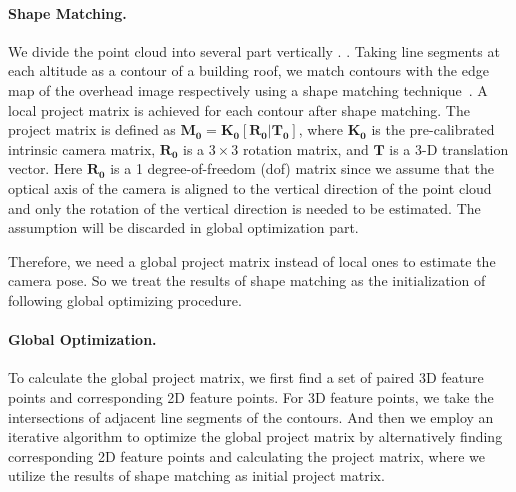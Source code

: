 \paragraph{Shape Matching.}
%
We divide the point cloud into several part vertically . 
 .
%
Taking line segments at each altitude as a contour of a building roof, we match contours with the edge map of the overhead image respectively using a shape matching technique~\cite{Zhang}. 
%
A local project matrix is achieved for each contour after shape matching. The project matrix is defined as $\mathbf{M_0}=\mathbf{K_0[R_0|T_0]}$, where $\mathbf{K_0}$ is the pre-calibrated intrinsic camera matrix, $\mathbf{R_0}$ is a $3\times3$ rotation matrix, and $\mathbf{T}$ is a 3-D translation vector. Here $\mathbf{R_0}$ is a 1 degree-of-freedom (dof) matrix since we assume that the optical axis of the camera is aligned to the vertical direction of the point cloud and only the rotation of the vertical direction is needed to be estimated. The assumption will be discarded in global optimization part.

%
Therefore, we need a global project matrix instead of local ones to estimate the camera pose. 
So we treat the results of shape matching as the initialization of following global optimizing procedure. 


\paragraph{Global Optimization.}
%
%
To calculate the global project matrix, we first find a set of paired 3D feature points and corresponding 2D feature points. 
%
For 3D feature points, we take the intersections of adjacent line segments of the contours. 
%
And then we employ an iterative algorithm to optimize the global project matrix by alternatively finding corresponding 2D feature points and calculating the project matrix, where we utilize the results of shape matching as initial project matrix.
 

